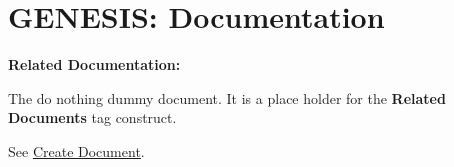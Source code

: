\documentclass[12pt]{article}
\begin{document}
\section*{GENESIS: Documentation}

{\bf Related Documentation:}

\noindent The do nothing dummy document. It is a place holder for the {\bf Related Documents} tag construct.

See \href{../document-create/dicument-create.tex}{Create Document}.
\end{document}
